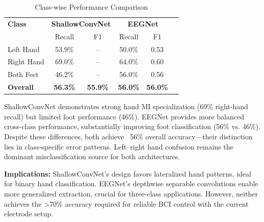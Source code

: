 \begin{table}[H]
\centering
\small
\caption{Class-wise Performance Comparison}
\label{tab:class_metrics}
\begin{tabular}{lccc|cc}
\hline
\textbf{Class} & \multicolumn{2}{c}{\textbf{ShallowConvNet}} & \multicolumn{2}{c}{\textbf{EEGNet}} \\
& Recall & F1 & Recall & F1 \\
\hline
Left Hand & 53.9\% & -- & 50.0\% & 0.53 \\
Right Hand & 69.0\% & -- & 64.0\% & 0.60 \\
Both Feet & 46.2\% & -- & 56.0\% & 0.56 \\
\hline
\textbf{Overall} & \textbf{56.3\%} & \textbf{55.9\%} & \textbf{56.0\%} & \textbf{56.0\%} \\
\hline
\end{tabular}
\end{table}

ShallowConvNet demonstrates strong hand MI specialization (69\% right-hand recall) but limited foot performance (46\%). EEGNet provides more balanced cross-class performance, substantially improving foot classification (56\% vs. 46\%). Despite these differences, both achieve ~56\% overall accuracy—their distinction lies in class-specific error patterns. Left--right hand confusion remains the dominant misclassification source for both architectures.

\textbf{Implications:} ShallowConvNet's design favors lateralized hand patterns, ideal for binary hand classification. EEGNet's depthwise separable convolutions enable more generalized extraction, crucial for three-class applications. However, neither achieves the >70\% accuracy required for reliable BCI control with the current electrode setup.

